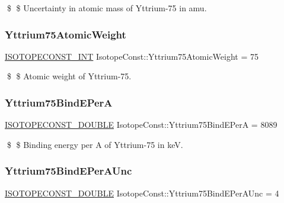 \$ \$ Uncertainty in atomic mass of Yttrium-\/75 in amu. \mbox{\label{group___isotope_const-_yttrium-_y75_gaf698a58bbc738bb103ef26048d756e0e}} 
\subsubsection{\texorpdfstring{Yttrium75\+Atomic\+Weight}{Yttrium75AtomicWeight}}
{\footnotesize\ttfamily \mbox{\hyperlink{group___isotope_const-_macros_ga5f18360b3e99483a35c32d789e62621c}{I\+S\+O\+T\+O\+P\+E\+C\+O\+N\+S\+T\+\_\+\+I\+NT}} Isotope\+Const\+::\+Yttrium75\+Atomic\+Weight = 75}

\$ \$ Atomic weight of Yttrium-\/75. \mbox{\label{group___isotope_const-_yttrium-_y75_gad42c7af9f2553a8c036f7b6af0d20b87}} 
\subsubsection{\texorpdfstring{Yttrium75\+Bind\+E\+PerA}{Yttrium75BindEPerA}}
{\footnotesize\ttfamily \mbox{\hyperlink{group___isotope_const-_macros_ga8f45a7272ce02c0b4c65c44636ed719a}{I\+S\+O\+T\+O\+P\+E\+C\+O\+N\+S\+T\+\_\+\+D\+O\+U\+B\+LE}} Isotope\+Const\+::\+Yttrium75\+Bind\+E\+PerA = 8089}

\$ \$ Binding energy per A of Yttrium-\/75 in keV. \mbox{\label{group___isotope_const-_yttrium-_y75_ga66a84c7f2cfb210d94f1f78705ad9ebc}} 
\subsubsection{\texorpdfstring{Yttrium75\+Bind\+E\+Per\+A\+Unc}{Yttrium75BindEPerAUnc}}
{\footnotesize\ttfamily \mbox{\hyperlink{group___isotope_const-_macros_ga8f45a7272ce02c0b4c65c44636ed719a}{I\+S\+O\+T\+O\+P\+E\+C\+O\+N\+S\+T\+\_\+\+D\+O\+U\+B\+LE}} Isotope\+Const\+::\+Yttrium75\+Bind\+E\+Per\+A\+Unc = 4}

